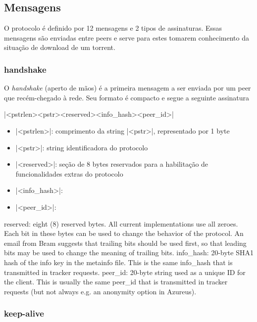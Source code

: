 \subsection*{Mensagens}

O protocolo é definido por 12 mensagens e 2 tipos de assinaturas. Essas mensagens são
enviadas entre \glspl*{peer} e serve para estes tomarem conhecimento da situação de
download de um \gls*{torrent}.

\subsubsection*{handshake}

O \emph{handshake} (aperto de mãos) é a primeira mensagem a ser enviada por um
\gls*{peer} que recém-chegado à rede. Seu formato é compacto e segue a seguinte
assinatura

\bverb|<pstrlen><pstr><reserved><info_hash><peer_id>|

\begin{itemize}
    \item \bverb|<pstrlen>|: comprimento da string \bverb|<pstr>|, representado por 1
        byte

    \item \bverb|<pstr>|: \gls*{string} identificadora do protocolo

    \item \bverb|<reserved>|: seção de 8 bytes reservados para a habilitação de
        funcionalidades extras do protocolo

    \item \bverb|<info\_hash>|:

    \item \bverb|<peer\_id>|:
\end{itemize}

reserved: eight (8) reserved bytes. All current implementations use all zeroes. Each bit in these bytes can be used to change the behavior of the protocol. An email from Bram suggests that trailing bits should be used first, so that leading bits may be used to change the meaning of trailing bits.
info_hash: 20-byte SHA1 hash of the info key in the metainfo file. This is the same info_hash that is transmitted in tracker requests.
peer_id: 20-byte string used as a unique ID for the client. This is usually the same peer_id that is transmitted in tracker requests (but not always e.g. an anonymity option in Azureus).

\subsubsection*{keep-alive}
